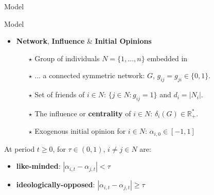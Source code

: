 \documentclass[xcolor=table,handout]{beamer}
\begin{document}
\begin{frame}
\begin{tcolorbox}[enhanced,attach boxed title to top center={yshift=-3mm,yshifttext=-1mm}, colback=red!3,colframe=red!40,colbacktitle=red!40 ,fonttitle=\bfseries, boxed title style={size=small,colframe=red!50} ] 
\centering Model
\end{tcolorbox}
\end{frame}

\begin{frame}{Model}
\begin{itemize}\setlength\itemsep{1em}
	\item {\bf\color{purple}Network}, {\bf\color{purple}Influence} \& {\bf\color{purple}Initial Opinions} 
	\begin{itemize}\setlength\itemsep{1em}
		\item[$\star$] Group of individuals $N = \{ 1, \ldots, n\}$ embedded in
		\item[$\star$] ... a connected symmetric network: $G$, $g_{ij} = g_{ji} \in \{ 0,1\}$.
		\item[$\star$] Set of friends of $i \in N$: $\{ j \in N: g_{ij} =1 \}$ and $d_i = |N_i|$. 
		\item[$\star$] The influence or {\bf\color{purple}centrality} of $i \in N$: $\delta_i (G) \in \mathbb{R}_{+}^{*}$.
		\item[$\star$] Exogenous initial opinion for $i \in N$: $\alpha_{i,0} \in [-1,1]$
		
	\end{itemize}
	\end{itemize}
	\begin{tcolorbox}[enhanced,attach boxed title to top center={yshift=-3mm,yshifttext=-1mm}, colback=red!3,colframe=red!40,colbacktitle=red!40 ,fonttitle=\bfseries, boxed title style={size=small,colframe=red!50}, title ={Definition} ]  At period $t \geq 0$, for $\tau \in (0,1)$, $i \neq j \in N$ are:
	\begin{itemize}
		\item {\bf\color{purple} like-minded}: $|\alpha_{i,t} - \alpha_{j,t}| < \tau$
		\item {\bf\color{purple} ideologically-opposed}: $|\alpha_{i,t} - \alpha_{j,t}| \geq \tau$
	\end{itemize}
	\end{tcolorbox}

\end{frame}
%
\end{document}
